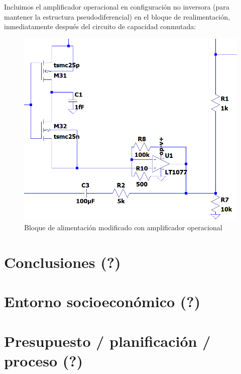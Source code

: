 \documentclass[12pt]{report} %
\begin{document}
	Incluimos el amplificador operacional en configuración no inversora (para mantener la estructura pseudodiferencial) en el bloque de realimentación, inmediatamente después del circuito de capacidad conmutada:
	
	\begin{figure}[H]
		\includegraphics[width=\textwidth]{vco-closed-opamp-block.png}
		\caption[Bloque de alimentación modificado con amplificador operacional]{Bloque de alimentación modificado con amplificador operacional}
		\label{fig:vco-closed-opamp-block.png}
	\end{figure}
	
\chapter{Conclusiones (?)}
\chapter{Entorno socioeconómico (?)}
\chapter{Presupuesto / planificación / proceso (?)}


\nocite{*} %

\clearpage


\printbibliography


\end{document}
